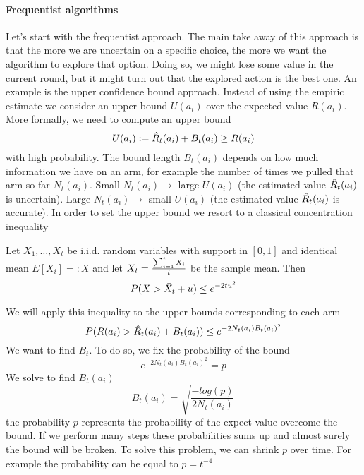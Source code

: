 \documentclass[main.tex]{subfiles}
\begin{document}
\paragraph{Frequentist algorithms}
Let's start with the frequentist approach. The main take away of this approach is that the more we are uncertain on a specific choice, the more we want the algorithm to explore that option. Doing so, we might lose some value in the current round, but it might turn out that the explored action is the best one. An example is the upper confidence bound approach. Instead of using the empiric estimate we consider an upper bound $U(a_i)$
over the expected value $R(a_i)$. More formally, we need to compute an upper bound
\begin{equation*}
    U(a_i) := \Hat{R}_t(a_i) + B_t(a_i) \geq R(a_i)
\end{equation*}
with high probability. The bound length $B_t(a_i)$ depends on how much information we have on an arm, for example the number of times we pulled that arm so far $N_t(a_i)$.
Small $N_t(a_i) \rightarrow$ large $U(a_i)$ (the estimated value $\Hat{R}_t(a_i)$ is uncertain). Large $N_t(a_i) \rightarrow$ small $U(a_i)$ (the estimated value $\Hat{R}_t(a_i)$ is accurate).
In order to set the upper bound we resort to a classical concentration inequality
\begin{definition}
Let $X_1,\dots,X_t$ be i.i.d. random variables with support in $[0, 1]$ and identical mean $E[X_i] =: X$ and let $\Bar{X}_t=\frac{\sum_{i=1}^t X_i}{t}$ be the sample mean. Then
\begin{equation*}
    P(X > \Bar{X}_t + u) \leq e^{-2tu^2}
\end{equation*}
\end{definition}
\par \noindent
We will apply this inequality to the upper bounds corresponding to each arm
\begin{equation}
    P(R(a_i) > \Hat{R}_t(a_i) + B_t(a_i)) \leq e^{-2N_t(a_i)B_t(a_i)^2}
\end{equation}
We want to find $B_t$. To do so, we fix the probability of the bound
\begin{equation*}
    e^{-2N_t(a_i)B_t(a_i)^2} = p
\end{equation*}
We solve to find $B_t(a_i)$
\begin{equation*}
    B_t(a_i) = \sqrt{\frac{-log(p)}{2N_t(a_i)}}
\end{equation*}
the probability $p$ represents the probability of the expect value overcome the bound. If we perform many steps these probabilities sums up and almost surely the bound will be broken. To solve this problem, we can shrink $p$ over time. For example the probability can be equal to $p=t^{-4}$
\end{document}
